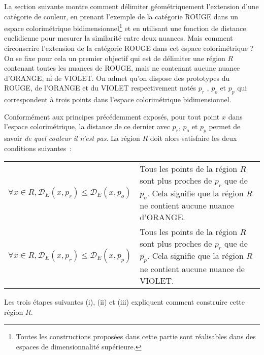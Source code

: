 \documentclass{article}
\begin{document}
La section suivante montre comment délimiter géométriquement l’extension d’une
catégorie de couleur, en prenant l’exemple de la catégorie ROUGE dans un espace colorimétrique bidimensionnel\footnote{Toutes les constructions proposées dans cette partie sont réalisables dans des espaces de dimensionnalité supérieure.} et en utilisant une fonction de distance euclidienne pour mesurer la similarité entre deux nuances.
Mais comment circonscrire l’extension de la catégorie ROUGE dans cet espace colorimétrique ?
On se fixe pour cela un premier objectif qui est de délimiter une région $R$ contenant toutes les nuances de ROUGE, mais ne contenant aucune nuance d'ORANGE, ni de VIOLET. On admet qu’on dispose des prototypes du ROUGE, de l’ORANGE et du VIOLET respectivement notés \(p_r\) , \(p_o\) et \(p_p\) qui correspondent à trois points dans l’espace colorimétrique bidimensionnel. 

Conformément aux principes précédemment exposés, pour tout point \( x \) dans l'espace colorimétrique, la distance de ce dernier avec \(p_r\), \(p_o\) et \(p_p\) permet de savoir \textit{de quel couleur il n'est pas}. La région $R$ doit alors satisfaire les deux conditions suivantes~:

\noindent
\begin{tabularx}{\textwidth}{ 
    >{\centering\arraybackslash}m{} 
    X 
}
    
    \[ \forall x \in R, \mathcal{D}_E(x, p_r) \le \mathcal{D}_E(x, p_o) \]
    & 
    Tous les points de la région $R$ sont plus proches de $p_r$ que de $p_o$. Cela signifie que la région $R$ ne contient aucune nuance d'ORANGE.
    \\
    \[ \forall x \in R, \mathcal{D}_E(x, p_r) \le \mathcal{D}_E(x, p_p) \]
    & 
    Tous les points de la région $R$ sont plus proches de $p_r$ que de $p_p$.
    \vspace{0.5em} Cela signifie que la région $R$ ne contient aucune nuance de VIOLET.
    
    
\end{tabularx}

\bigskip

Les trois étapes suivantes (i), (ii) et (iii) expliquent comment construire cette région $R$.
\end{document}
